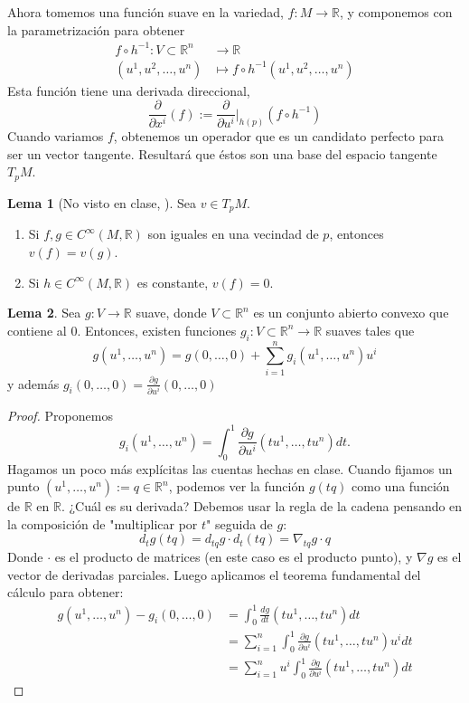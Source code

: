 \documentclass[spanish]{book}
\theoremstyle{definition}
\newtheorem*{lema}{Lema}
\newcommand{\R}{\mathbb{R}}
\newcommand{\Cinf}{C^\infty}
\begin{document}
	Ahora tomemos una función suave en la variedad, $f:M\to\R$, y componemos con la parametrización para obtener
	\begin{align*}
		f\circ h^{-1}:V\subset\R^n&\to\R\\
		(u^1,u^2,\ldots,u^n)&\mapsto f\circ h^{-1}(u^1,u^2,\ldots,u^n)
	\end{align*}
	Esta función tiene una derivada direccional,
	\[\frac{\partial}{\partial x^i}(f):=\frac{\partial}{\partial u^i}\Big|_{h(p)}(f\circ h^{-1})\]
	Cuando variamos $f$, obtenemos un operador que es un candidato perfecto para ser un vector tangente. Resultará que éstos son una base del espacio tangente $T_pM$.
	\begin{lema}[No visto en clase, \cite{ONeill}]
		Sea $v\in T_pM$.
		\begin{enumerate}
			\item Si $f,g\in\Cinf(M,\R)$ son iguales en una vecindad de $p$, entonces $v(f)=v(g)$.
			\item Si $h\in\Cinf(M,\R)$ es constante, $v(f)=0$.
		\end{enumerate}
	\end{lema}
	\begin{lema}
		Sea $g:V\to\R$ suave, donde $V\subset\R^n$ es un conjunto abierto convexo que contiene al $0$. Entonces, existen funciones $g_i:V\subset\R^n\to\R$ suaves tales que
		\[g(u^1,\ldots,u^n)=g(0,\ldots,0)+\sum_{i=1}^ng_i(u^1,\ldots,u^n)u^i\]
		y además $g_i(0,\ldots,0)=\frac{\partial g}{\partial u^i}(0,\ldots,0)$
	\end{lema}
	\begin{proof}
		Proponemos
		\[g_i(u^1,\ldots,u^n)=\int_0^1\frac{\partial g}{\partial u^i}(tu^1,\ldots,tu^n)dt.\]
		Hagamos un poco más explícitas las cuentas hechas en clase. Cuando fijamos un punto $(u^1,\ldots,u^n):=q\in\R^n$, podemos ver la función $g(tq)$ como una función de $\R$ en $\R$. ¿Cuál es su derivada? Debemos usar la regla de la cadena pensando en la composición de "multiplicar por $t$" seguida de $g$:
		\[d_t g(tq)=d_{tq}g\cdot d_t(tq)=\nabla_{tq}g\cdot q\]
		Donde $\cdot$ es el producto de matrices (en este caso es el producto punto), y $\nabla g$ es el vector de derivadas parciales. Luego aplicamos el teorema fundamental del cálculo para obtener:
		\begin{align*}
			g(u^1,\ldots,u^n)-g_i(0,\ldots,0)&=\int_0^1\frac{dg}{dt}(tu^1,\ldots,tu^n)dt\\
			&=\sum_{i=1}^n\int_0^1\frac{\partial g}{\partial u^i}(tu^1,\ldots,tu^n)u^idt\\
			&=\sum_{i=1}^nu^i\int_0^1\frac{\partial g}{\partial u^i}(tu^1,\ldots,tu^n)dt
		\end{align*}
	\end{proof}
\end{document}
